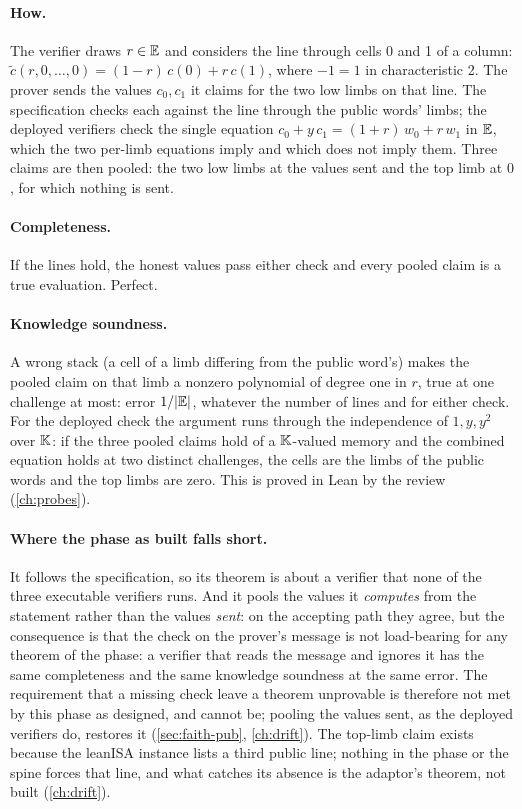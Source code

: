 \paragraph{How.} The verifier draws $r \in \mathbb{E}$ and considers the line through cells 0 and 1 of
a column: $\widetilde{c}(r, 0, \dots, 0) = (1 - r)\, c(0) + r\, c(1)$, where $-1 = 1$ in
characteristic 2. The prover sends the values $c_0, c_1$ it claims for the two low limbs on
that line. The specification checks each against the line through the public words' limbs;
the deployed verifiers check the single equation $c_0 + y\, c_1 = (1 + r)\, w_0 + r\, w_1$ in
$\mathbb{E}$, which the two per-limb equations imply and which does not imply them. Three claims are
then pooled: the two low limbs at the values sent and the top limb at $0$, for which nothing is
sent.

\paragraph{Completeness.} If the lines hold, the honest values pass either check and every
pooled claim is a true evaluation. Perfect.

\paragraph{Knowledge soundness.} A wrong stack (a cell of a limb differing from the public
word's) makes the pooled claim on that limb a nonzero polynomial of degree one in $r$, true at
one challenge at most: error $1 / \lvert \mathbb{E}\rvert$, whatever the number of lines and for either
check. For the deployed check the argument runs through the independence of $1, y, y^2$ over
$\mathbb{K}$: if the three pooled claims hold of a $\mathbb{K}$-valued memory and the combined equation holds
at two distinct challenges, the cells are the limbs of the public words and the top limbs are
zero. This is proved in Lean by the review (\cref{ch:probes}).

\paragraph{Where the phase as built falls short.} It follows the specification, so its theorem
is about a verifier that none of the three executable verifiers runs. And it pools the values
it \emph{computes} from the statement rather than the values \emph{sent}: on the accepting path
they agree, but the consequence is that the check on the prover's message is not load-bearing
for any theorem of the phase: a verifier that reads the message and ignores it has the same
completeness and the same knowledge soundness at the same error. The requirement that a missing
check leave a theorem unprovable is therefore not met by this phase as designed, and cannot be;
pooling the values sent, as the deployed verifiers do, restores it (\cref{sec:faith-pub},
\cref{ch:drift}). The top-limb claim exists because the leanISA instance lists a third public
line; nothing in the phase or the spine forces that line, and what catches its absence is the
adaptor's theorem, not built (\cref{ch:drift}).

